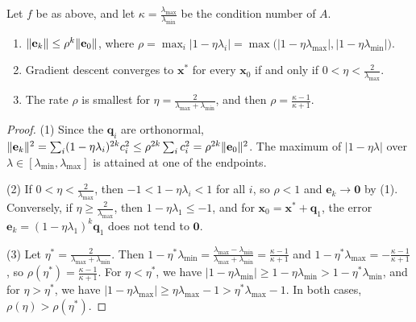 \begin{theorem}\label{L3-thm:gd-quadratic}
    Let $f$ be as above, and let $\kappa = \frac{\lambda_{\max}}{\lambda_{\min}}$ be the condition number of $A$.
    \begin{enumerate}
        \item $\lVert \mathbf{e}_k \rVert \leq \rho^k \lVert \mathbf{e}_0 \rVert$, where $\rho = \max_i |1 - \eta\lambda_i| = \max\big(|1 - \eta\lambda_{\max}|, |1 - \eta\lambda_{\min}|\big)$.
        \item Gradient descent converges to $\mathbf{x}^*$ for every $\mathbf{x}_0$ if and only if $0 < \eta < \frac{2}{\lambda_{\max}}$.
        \item The rate $\rho$ is smallest for $\eta = \frac{2}{\lambda_{\max} + \lambda_{\min}}$, and then $\rho = \frac{\kappa - 1}{\kappa + 1}$.
    \end{enumerate}
\end{theorem}

\begin{proof}
    (1) Since the $\mathbf{q}_i$ are orthonormal, $\lVert \mathbf{e}_k \rVert^2 = \sum_i (1 - \eta\lambda_i)^{2k} c_i^2 \leq \rho^{2k}\sum_i c_i^2 = \rho^{2k}\lVert \mathbf{e}_0 \rVert^2$. The maximum of $|1 - \eta\lambda|$ over $\lambda \in [\lambda_{\min}, \lambda_{\max}]$ is attained at one of the endpoints.

    (2) If $0 < \eta < \frac{2}{\lambda_{\max}}$, then $-1 < 1 - \eta\lambda_i < 1$ for all $i$, so $\rho < 1$ and $\mathbf{e}_k \to \mathbf{0}$ by (1). Conversely, if $\eta \geq \frac{2}{\lambda_{\max}}$, then $1 - \eta\lambda_1 \leq -1$, and for $\mathbf{x}_0 = \mathbf{x}^* + \mathbf{q}_1$, the error $\mathbf{e}_k = (1 - \eta\lambda_1)^k\mathbf{q}_1$ does not tend to $\mathbf{0}$.

    (3) Let $\eta^* = \frac{2}{\lambda_{\max} + \lambda_{\min}}$. Then $1 - \eta^*\lambda_{\min} = \frac{\lambda_{\max} - \lambda_{\min}}{\lambda_{\max} + \lambda_{\min}} = \frac{\kappa - 1}{\kappa + 1}$ and $1 - \eta^*\lambda_{\max} = -\frac{\kappa - 1}{\kappa + 1}$, so $\rho(\eta^*) = \frac{\kappa - 1}{\kappa + 1}$. For $\eta < \eta^*$, we have $|1 - \eta\lambda_{\min}| \geq 1 - \eta\lambda_{\min} > 1 - \eta^*\lambda_{\min}$, and for $\eta > \eta^*$, we have $|1 - \eta\lambda_{\max}| \geq \eta\lambda_{\max} - 1 > \eta^*\lambda_{\max} - 1$. In both cases, $\rho(\eta) > \rho(\eta^*)$.
\end{proof}

